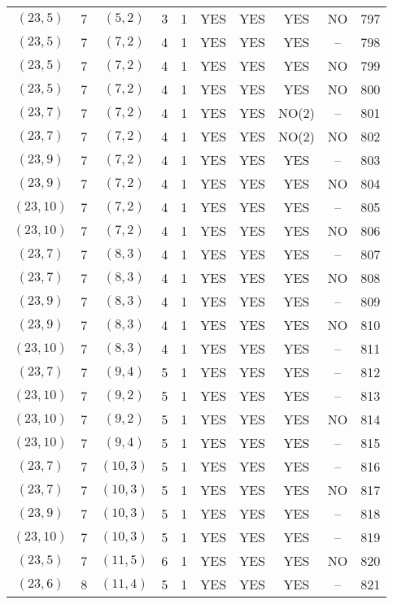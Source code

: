 \begin{longtable}{|c|c|c|c|c|c|c|c|c|c|}
$(23, 5)$ & 7 & $(5, 2)$ & 3 & 1 & YES & YES & YES & NO & 797\\
$(23, 5)$ & 7 & $(7, 2)$ & 4 & 1 & YES & YES & YES & -- & 798\\
$(23, 5)$ & 7 & $(7, 2)$ & 4 & 1 & YES & YES & YES & NO & 799\\
$(23, 5)$ & 7 & $(7, 2)$ & 4 & 1 & YES & YES & YES & NO & 800\\
$(23, 7)$ & 7 & $(7, 2)$ & 4 & 1 & YES & YES & NO(2) & -- & 801\\
$(23, 7)$ & 7 & $(7, 2)$ & 4 & 1 & YES & YES & NO(2) & NO & 802\\
$(23, 9)$ & 7 & $(7, 2)$ & 4 & 1 & YES & YES & YES & -- & 803\\
$(23, 9)$ & 7 & $(7, 2)$ & 4 & 1 & YES & YES & YES & NO & 804\\
$(23, 10)$ & 7 & $(7, 2)$ & 4 & 1 & YES & YES & YES & -- & 805\\
$(23, 10)$ & 7 & $(7, 2)$ & 4 & 1 & YES & YES & YES & NO & 806\\
$(23, 7)$ & 7 & $(8, 3)$ & 4 & 1 & YES & YES & YES & -- & 807\\
$(23, 7)$ & 7 & $(8, 3)$ & 4 & 1 & YES & YES & YES & NO & 808\\
$(23, 9)$ & 7 & $(8, 3)$ & 4 & 1 & YES & YES & YES & -- & 809\\
$(23, 9)$ & 7 & $(8, 3)$ & 4 & 1 & YES & YES & YES & NO & 810\\
$(23, 10)$ & 7 & $(8, 3)$ & 4 & 1 & YES & YES & YES & -- & 811\\
$(23, 7)$ & 7 & $(9, 4)$ & 5 & 1 & YES & YES & YES & -- & 812\\
$(23, 10)$ & 7 & $(9, 2)$ & 5 & 1 & YES & YES & YES & -- & 813\\
$(23, 10)$ & 7 & $(9, 2)$ & 5 & 1 & YES & YES & YES & NO & 814\\
$(23, 10)$ & 7 & $(9, 4)$ & 5 & 1 & YES & YES & YES & -- & 815\\
$(23, 7)$ & 7 & $(10, 3)$ & 5 & 1 & YES & YES & YES & -- & 816\\
$(23, 7)$ & 7 & $(10, 3)$ & 5 & 1 & YES & YES & YES & NO & 817\\
$(23, 9)$ & 7 & $(10, 3)$ & 5 & 1 & YES & YES & YES & -- & 818\\
$(23, 10)$ & 7 & $(10, 3)$ & 5 & 1 & YES & YES & YES & -- & 819\\
$(23, 5)$ & 7 & $(11, 5)$ & 6 & 1 & YES & YES & YES & NO & 820\\
$(23, 6)$ & 8 & $(11, 4)$ & 5 & 1 & YES & YES & YES & -- & 821\\

\end{longtable}
